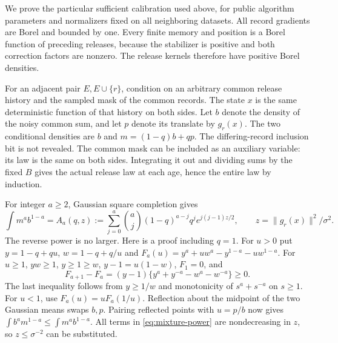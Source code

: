 \documentclass[a4paper,11pt]{article}
\theoremstyle{remark}
\newcommand{\norm}[1]{\lVert#1\rVert}
\begin{document}
We prove the particular sufficient calibration used above, for public
algorithm parameters and normalizers fixed on all neighboring datasets.
All record gradients are Borel and bounded by one. Every finite memory and
position is a Borel function of preceding releases, because the stabilizer
is positive and both correction factors are nonzero. The release kernels
therefore have positive Borel densities.

For an adjacent pair $E,E\cup\{r\}$, condition on an arbitrary common
release history and the sampled mask of the common records. The state
$x$ is the same deterministic function of that history on both sides.
Let $b$ denote the density of the noisy common sum, and let $p$ denote its
translate by $g_r(x)$. The two conditional densities are $b$ and
$m=(1-q)b+qp$. The differing-record inclusion bit is not revealed.
The common mask can be included as an auxiliary variable: its law is the
same on both sides. Integrating it out and dividing sums by the fixed $B$
gives the actual release law at each age, hence the entire law by induction.

For integer $a\ge2$, Gaussian square completion gives
\begin{equation}\label{eq:mixture-power}
 \int m^a b^{1-a}=A_a(q,z):=
 \sum_{j=0}^a\binom aj(1-q)^{a-j}q^j e^{j(j-1)z/2},
 \qquad z=\norm{g_r(x)}^2/\sigma^2.
\end{equation}
The reverse power is no larger. Here is a proof including $q=1$.
For $u>0$ put $y=1-q+qu$, $w=1-q+q/u$ and
$F_a(u)=y^a+uw^a-y^{1-a}-uw^{1-a}$.
For $u\ge1$, $yw\ge1$, $y\ge1\ge w$, $y-1=u(1-w)$,
$F_1=0$, and
\[
 F_{a+1}-F_a=(y-1)\{y^a+y^{-a}-w^a-w^{-a}\}\ge0.
\]
The last inequality follows from $y\ge1/w$ and monotonicity of
$s^a+s^{-a}$ on $s\ge1$. For $u<1$, use $F_a(u)=uF_a(1/u)$.
Reflection about the midpoint of the two Gaussian means swaps $b,p$.
Pairing reflected points with $u=p/b$ now gives
$\int b^am^{1-a}\le\int m^ab^{1-a}$. All terms in
\eqref{eq:mixture-power} are nondecreasing in $z$, so $z\le\sigma^{-2}$
can be substituted.
\end{document}

